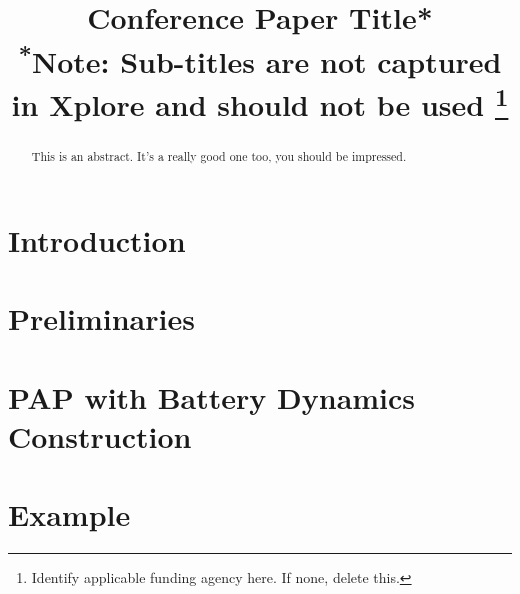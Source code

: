 \documentclass[conference]{IEEEtran}
\begin{document}
\title{Conference Paper Title*\\
{\footnotesize \textsuperscript{*}Note: Sub-titles are not captured in Xplore and
should not be used}
\thanks{Identify applicable funding agency here. If none, delete this.}
}


\maketitle

\begin{abstract}
This is an abstract. It's a really good one too, you should be impressed.
\end{abstract}

\begin{IEEEkeywords}

\end{IEEEkeywords}

\section{Introduction}
\section{Preliminaries}
\section{PAP with Battery Dynamics Construction}
\section{Example}
\end{document}
